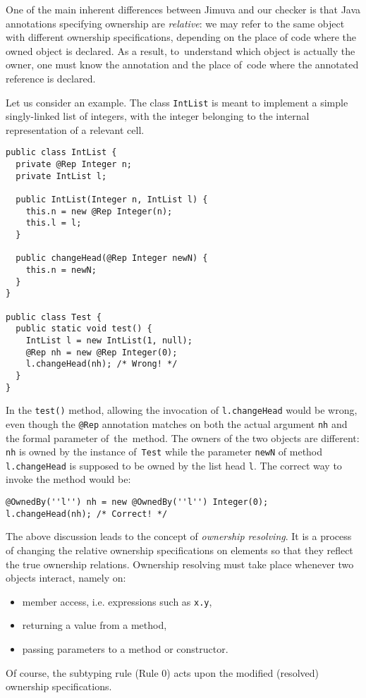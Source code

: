 \documentclass{pracamgr}
\theoremstyle{break}
\theoremstyle{break}
\theoremstyle{break}
\begin{document}
One of the main inherent differences between Jimuva and our checker is
that Java annotations specifying ownership are \emph{relative}: we may
refer to the same object with different ownership specifications,
depending on the place of code where the owned object is declared. As
a result, to~understand which object is actually the owner, one must
know the annotation and the place of~code where the annotated
reference is declared.

Let us consider an example. The class \texttt{IntList} is meant to
implement a simple singly-linked list of integers, with the integer
belonging to the internal representation of a relevant cell. 
\begin{lstlisting}
public class IntList {
  private @Rep Integer n;
  private IntList l;

  public IntList(Integer n, IntList l) {
    this.n = new @Rep Integer(n);
    this.l = l;
  }

  public changeHead(@Rep Integer newN) {
    this.n = newN;
  }
}

public class Test {
  public static void test() {
    IntList l = new IntList(1, null);
    @Rep nh = new @Rep Integer(0);
    l.changeHead(nh); /* Wrong! */
  }
}
\end{lstlisting}
In the \texttt{test()} method, allowing the invocation of
\texttt{l.changeHead} would be wrong, even though the \texttt{@Rep}
annotation matches on both the actual argument \texttt{nh} and the
formal parameter of~the~method. The owners of the two objects are
different: \texttt{nh} is owned by the instance of~\texttt{Test} while
the parameter \texttt{newN} of method \texttt{l.changeHead} is
supposed to be owned by the list head \texttt{l}. The correct way to
invoke the method would be:
\begin{lstlisting}
@OwnedBy(''l'') nh = new @OwnedBy(''l'') Integer(0);
l.changeHead(nh); /* Correct! */
\end{lstlisting}

The above discussion leads to the concept of \emph{ownership
  resolving}. It is a process of changing the relative ownership
specifications on elements so that they reflect the true ownership
relations. Ownership resolving must take place whenever two objects
interact, namely on:
\begin{itemize}
\item member access, i.e. expressions such as \texttt{x.y},
\item returning a value from a method, 
\item passing parameters to a method or constructor.
\end{itemize}
Of course, the subtyping rule (Rule 0) acts upon the modified
(resolved) ownership specifications.
\end{document}
